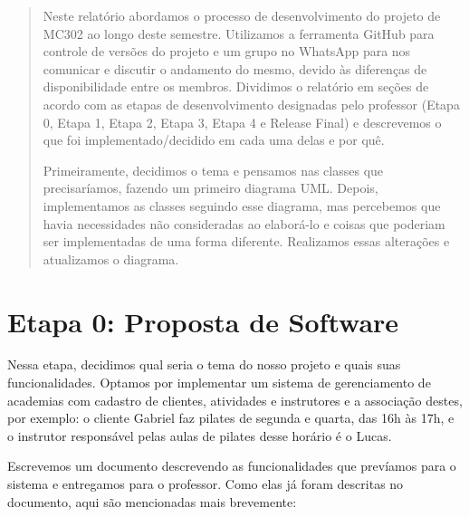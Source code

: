 \documentclass[11pt,twoside]{article}
\begin{document}
\begin{abstract}
Neste relatório abordamos o processo de desenvolvimento do projeto de MC302 ao longo deste semestre. Utilizamos a ferramenta
GitHub para controle de versões do projeto e um grupo no WhatsApp para nos comunicar e discutir o andamento do mesmo, devido às
diferenças de disponibilidade entre os membros. Dividimos o relatório em seções de acordo com as etapas de desenvolvimento
designadas pelo professor (Etapa 0, Etapa 1, Etapa 2, Etapa 3, Etapa 4 e Release Final) e descrevemos o que foi implementado/decidido
em cada uma delas e por quê.

Primeiramente, decidimos o tema e pensamos nas classes que precisaríamos, fazendo um primeiro diagrama UML. Depois, implementamos
as classes seguindo esse diagrama, mas percebemos que havia necessidades não consideradas ao elaborá-lo e coisas que poderiam ser
implementadas de uma forma diferente. Realizamos essas alterações e atualizamos o diagrama.
\end{abstract}

\clearpage
\tableofcontents

\clearpage

\section{Etapa 0: Proposta de Software}
Nessa etapa, decidimos qual seria o tema do nosso projeto e quais suas funcionalidades.
Optamos por implementar um sistema de gerenciamento de academias com cadastro de clientes, atividades
e instrutores e a associação destes, por exemplo: o cliente Gabriel faz pilates
de segunda e quarta, das 16h às 17h, e o instrutor responsável pelas aulas de pilates desse horário é o Lucas.

Escrevemos um documento descrevendo as funcionalidades que prevíamos para o sistema e entregamos para o professor.
Como elas já foram descritas no documento, aqui são mencionadas mais brevemente:
\end{document}
